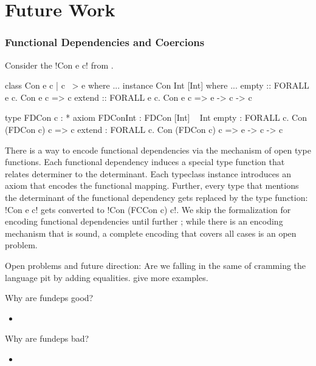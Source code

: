 \documentclass[screen,nonacm,manuscript,review]{acmart} %
\begin{document}
\section{Future Work}\label{sec:future-work}
\subsubsection{Functional Dependencies and Coercions}\label{sec:fc-encodes-fundeps}
Consider the !Con e c! from .

\begin{minipage}[ht]{0.5\linewidth}
\begin{code}
class Con e c | c ~> e where ...
instance Con Int [Int] where ...
  empty :: FORALL e c. Con e c => c
  extend :: FORALL e c. Con e c => e -> c -> c
\end{code}
\end{minipage}%
\begin{minipage}[ht]{0.5\linewidth}
\begin{code}
type FDCon c : *
axiom FDConInt : FDCon [Int] ~ Int
  empty  : FORALL c. Con (FDCon c) c => c
  extend : FORALL c. Con (FDCon c) c => e -> c -> c
\end{code}
\end{minipage}

There is a way to encode functional dependencies via the mechanism of open type functions. Each functional dependency induces a special type function that relates determiner to the determinant. Each typeclass instance introduces an axiom that encodes the functional mapping. Further, every type that mentions the determinant of the functional dependency gets replaced by the type function: !Con e c! gets converted to !Con (FCCon c) c!.
We skip the formalization for encoding functional dependencies until further ; while there is an encoding mechanism that is sound, a complete encoding that covers all cases is an open problem.

Open problems and future direction: Are we falling in the same of
cramming the language pit by adding equalities. give more examples.

Why are fundeps good?
\begin{itemize}
\item
\end{itemize}

Why are fundeps bad?
\begin{itemize}
\item
\end{itemize}
\end{document}
